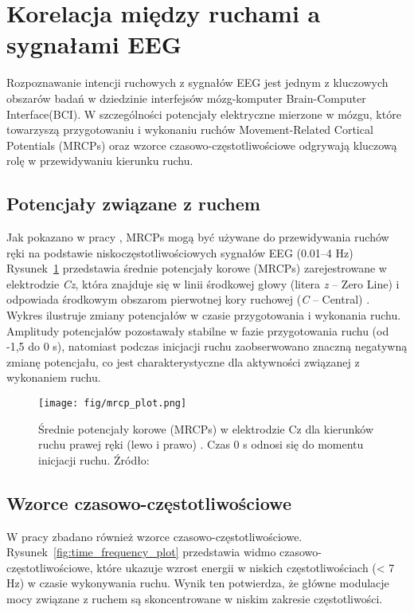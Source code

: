 \documentclass[eeg_v4.tex]{subfiles}
\begin{document}
    \section{Korelacja między ruchami a sygnałami EEG}

    Rozpoznawanie intencji ruchowych z sygnałów EEG jest jednym z kluczowych obszarów badań w dziedzinie interfejsów
    mózg-komputer Brain-Computer Interface(BCI). W szczególności potencjały elektryczne mierzone w mózgu, które
    towarzyszą przygotowaniu i wykonaniu ruchów Movement-Related Cortical Potentials
    (MRCPs) oraz wzorce czasowo-częstotliwościowe odgrywają kluczową rolę w przewidywaniu kierunku ruchu.

    \subsection{Potencjały związane z ruchem}
    Jak pokazano w pracy \cite{wang2022}
    , MRCPs mogą być używane do przewidywania ruchów ręki na podstawie niskoczęstotliwościowych sygnałów EEG (0.01–4 Hz)
    Rysunek~\ref{fig:mrcp_plot}
    przedstawia średnie potencjały korowe \cite{Silva2020} (MRCPs)
    zarejestrowane w elektrodzie \textit{Cz}, która znajduje się w linii środkowej
    głowy (litera \textit{z} – Zero Line) i odpowiada środkowym obszarom pierwotnej kory ruchowej (\textit{C}
    – Central) . Wykres ilustruje zmiany potencjałów w czasie przygotowania i wykonania ruchu. Amplitudy potencjałów
    pozostawały stabilne w fazie przygotowania ruchu (od -1,5 do 0 s), natomiast podczas inicjacji ruchu zaobserwowano
    znaczną negatywną zmianę potencjału, co jest charakterystyczne dla aktywności związanej z wykonaniem ruchu.


    \begin{figure}[h]
        \centering
        \texttt{[image: fig/mrcp\_plot.png]}
        \caption{Średnie potencjały korowe (MRCPs) w elektrodzie Cz dla kierunków ruchu prawej ręki (lewo i prawo)
            . Czas 0 s odnosi się do momentu inicjacji ruchu. Źródło: \cite{wang2022}}
        \label{fig:mrcp_plot}
    \end{figure}

    \subsection{Wzorce czasowo-częstotliwościowe}
    W pracy \cite{wang2022} zbadano również wzorce czasowo-częstotliwościowe. Rysunek~\ref{fig:time_frequency_plot}
    przedstawia widmo czasowo-częstotliwościowe, które ukazuje wzrost energii w niskich częstotliwościach (< 7 Hz) w
    czasie wykonywania ruchu. Wynik ten potwierdza, że główne modulacje mocy związane z ruchem są skoncentrowane w
    niskim zakresie częstotliwości.
\end{document}
